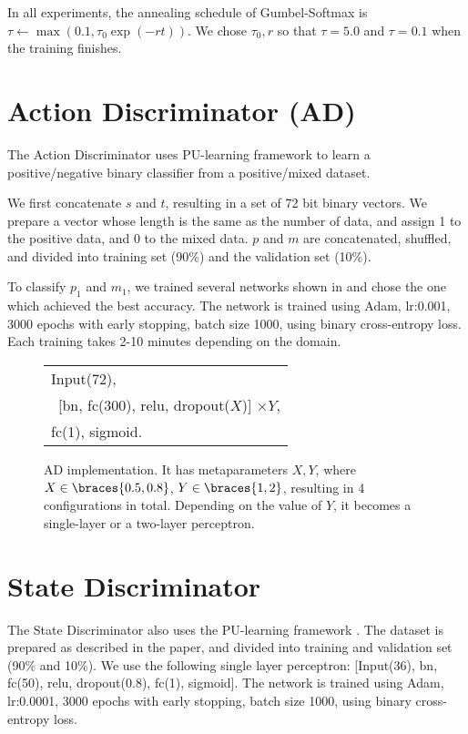 \documentclass[11pt]{article}
\begin{document}
In all experiments, the annealing schedule of Gumbel-Softmax is $\tau \leftarrow \max (0.1, \tau_0\exp(-rt))$.
We chose $\tau_0, r$ so that $\tau = 5.0$ and $\tau = 0.1$ when the training finishes.


\section{Action Discriminator (AD)}

The Action Discriminator uses PU-learning framework \cite{elkan2008learning}
to learn a positive/negative binary classifier from a positive/mixed
dataset.

We first concatenate $s$ and $t$, resulting in a set of 72 bit binary vectors.
We prepare a vector whose length is the same as the number of data, and assign 1 to the positive data,
and 0 to the mixed data.
$p$ and $m$ are concatenated, shuffled, and divided into training set (90\%) and the validation set (10\%).

To classify $p_1$ and $m_1$, we trained several networks shown in  and
chose the one which achieved the best accuracy.
The network is trained using Adam, lr:0.001, 3000 epochs with early stopping, batch size 1000,
using binary cross-entropy loss. Each training takes 2-10 minutes depending on the domain.

\begin{figure}[htb]
\centering
\begin{tabular}{|l|}
 Input(72), \\
 \ [bn, fc(300), relu, dropout($X$)] $\times Y$, \\
 fc(1), sigmoid.
\end{tabular}
\caption{AD implementation. It has metaparameters $X,Y$, where
$X\in \braces{0.5,0.8}$, $Y\in \braces{1,2}$, resulting in 4 configurations in total.
Depending on the value of $Y$, it becomes a single-layer or a two-layer perceptron.
}
\label{fig:ad-detail}
\end{figure}

\section{State Discriminator}

The State Discriminator also uses the PU-learning framework \cite{elkan2008learning}.
The dataset is prepared as described in the paper, and divided into training and validation set (90\% and 10\%).
We use the following single layer perceptron:
[Input(36), bn, fc(50), relu, dropout(0.8), fc(1), sigmoid].
% 
The network is trained using Adam, lr:0.0001, 3000 epochs with early stopping, batch size 1000,
using binary cross-entropy loss.
\end{document}
